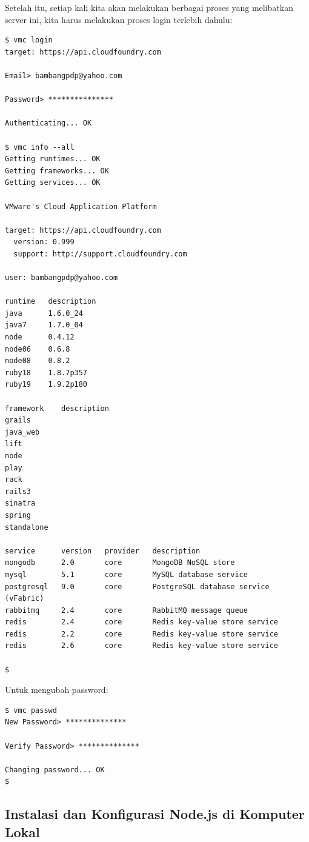 Setelah itu, setiap kali kita akan melakukan berbagai proses yang melibatkan server ini, kita harus melakukan proses login terlebih dahulu:

\lstset{language=bash,caption=Login ke server}
\begin{lstlisting}
$ vmc login 
target: https://api.cloudfoundry.com

Email> bambangpdp@yahoo.com

Password> ***************

Authenticating... OK

$ vmc info --all
Getting runtimes... OK
Getting frameworks... OK
Getting services... OK

VMware's Cloud Application Platform

target: https://api.cloudfoundry.com
  version: 0.999
  support: http://support.cloudfoundry.com

user: bambangpdp@yahoo.com

runtime   description
java      1.6.0_24   
java7     1.7.0_04   
node      0.4.12     
node06    0.6.8      
node08    0.8.2      
ruby18    1.8.7p357  
ruby19    1.9.2p180  

framework    description
grails       
java_web     
lift         
node         
play         
rack         
rails3       
sinatra      
spring       
standalone   

service      version   provider   description                          
mongodb      2.0       core       MongoDB NoSQL store                  
mysql        5.1       core       MySQL database service               
postgresql   9.0       core       PostgreSQL database service (vFabric)
rabbitmq     2.4       core       RabbitMQ message queue               
redis        2.4       core       Redis key-value store service        
redis        2.2       core       Redis key-value store service        
redis        2.6       core       Redis key-value store service    

$ 
\end{lstlisting}

Untuk mengubah password:

\lstset{language=bash,caption=Mengubah password server}
\begin{lstlisting}
$ vmc passwd 
New Password> **************

Verify Password> **************

Changing password... OK
$
\end{lstlisting}

\subsection{Instalasi dan Konfigurasi Node.js di Komputer Lokal}

